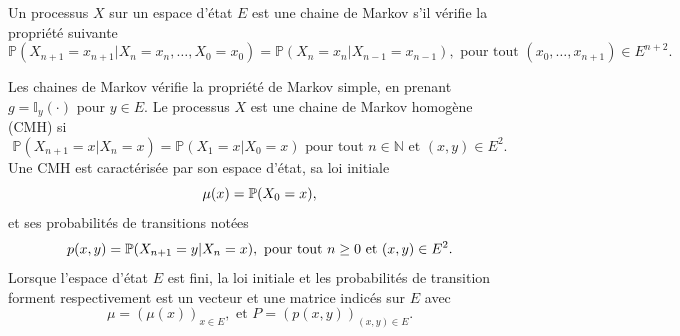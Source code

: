 \begin{ex}
Un processus $X$ sur un espace d'état $E$ est une chaine de Markov s'il vérifie la propriété suivante
$$
\mathbb{P}(X_{n+1} = x_{n+1}|X_{n}=x_{n},\ldots, X_0 = x_0) = \mathbb{P}(X_n = x_n|X_{n-1}=x_{n-1}), \text{ pour tout }(x_0,\ldots, x_{n+1})\in E^{n+2}.
$$

Les chaines de Markov vérifie la propriété de Markov simple, en prenant $g = \mathbb{I}_{y}(\cdot)$ pour $y\in E$. Le processus $X$ est une chaine de Markov homogène (CMH) si
$$
\mathbb{P}(X_{n+1} = x|X_{n}=x) = \mathbb{P}(X_{1} = x|X_{0}=x)\text{ pour tout }n\in\mathbb{N}\text{ et }(x,y)\in E^2.
$$
Une CMH est caractérisée par son espace d'état, sa loi initiale 
$$
\mu(x) = \mathbb{P}(X_0 = x),
$$
et ses probabilités de transitions notées
$$
p(x,y) = \mathbb{P}(X_{n+1} = y|X_{n}= x),\text{ pour tout }n\geq0\text{ et }(x,y)\in E^2.
$$
Lorsque l'espace d'état $E$ est fini, la loi initiale et les probabilités de transition forment respectivement est un vecteur et une matrice indicés sur $E$ avec
$$
\mu = (\mu(x))_{x\in E},\text{ et }P = (p(x,y))_{(x,y)\in E}.
$$
\end{ex}




